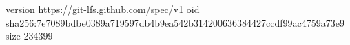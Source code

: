 version https://git-lfs.github.com/spec/v1
oid sha256:7e7089bdbe0389a719597db4b9ea542b314200636384427ccdf99ac4759a73e9
size 234399
